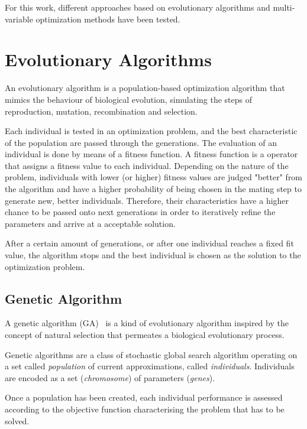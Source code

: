 For this work, different approaches based on evolutionary algorithms
and multi-variable optimization methods have been tested.


\section{Evolutionary Algorithms}
\label{sec:5.evo}

An evolutionary algorithm is a population-based optimization algorithm
that mimics the behaviour of biological evolution, simulating the steps of
reproduction, mutation, recombination and selection.

Each individual is tested in an optimization problem,
and the best characteristic of the population are passed through the generations.
The evaluation of an individual is done by means of a fitness function.
A fitness function is a operator that assigns a fitness value to each individual.
Depending on the nature of the problem, individuals with lower (or higher)
fitness values are judged "better" from the algorithm and have a higher probability
of being chosen in the mating step to generate new, better individuals.
Therefore, their characteristics have a higher chance to be passed onto next generations
in order to iteratively refine the parameters and arrive at a acceptable solution.

After a certain amount of generations, or after one individual reaches
a fixed fit value, the algorithm stops and the best individual is chosen
as the solution to the optimization problem.

\subsection{Genetic Algorithm}

A genetic algorithm (GA)~\cite{fleming2001genetic} is a kind of evolutionary algorithm inspired
by the concept of natural selection that permeates a biological evolutionary process.

Genetic algorithms are a class of stochastic global search algorithm
operating on a set called \textit{population} of current approximations,
called \textit{individuals}.
Individuals are encoded as a set (\textit{chromosome}) of parameters (\textit{genes}).

Once a population has been created, each individual performance is assessed
according to the objective function characterising the problem that has to be solved.

